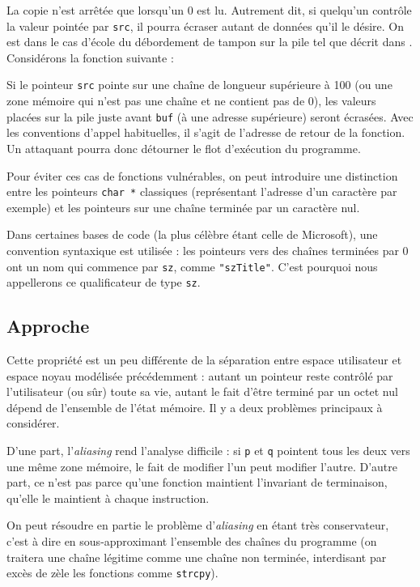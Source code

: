 
La copie n'est arrêtée que lorsqu'un 0 est lu. Autrement dit, si quelqu'un
contrôle la valeur pointée par \texttt{src}, il pourra écraser autant de données
qu'il le désire. On est dans le cas d'école du débordement de tampon sur la pile
tel que décrit dans \cite{SmashingTheStack}. Considérons la fonction suivante :


Si le pointeur \texttt{src} pointe sur une chaîne de longueur supérieure à 100
(ou une zone mémoire qui n'est pas une chaîne et ne contient pas de 0), les
valeurs placées sur la pile juste avant \texttt{buf} (à une adresse supérieure)
seront écrasées. Avec les conventions d'appel habituelles, il s'agit de
l'adresse de retour de la fonction. Un attaquant pourra donc détourner le flot
d'exécution du programme.

Pour éviter ces cas de fonctions vulnérables, on peut introduire une distinction
entre les pointeurs \texttt{char *} classiques (représentant l'adresse d'un
caractère par exemple) et les pointeurs sur une chaîne terminée par un caractère
nul.

Dans certaines bases de code (la plus célèbre étant celle de Microsoft), une
convention syntaxique est utilisée : les pointeurs vers des chaînes terminées
par 0 ont un nom qui commence par \texttt{sz}, comme \texttt{"szTitle"}. C'est
pourquoi nous appellerons ce qualificateur de type \texttt{sz}.

\subsection{Approche}

Cette propriété est un peu différente de la séparation entre espace utilisateur
et espace noyau modélisée précédemment : autant un pointeur reste contrôlé par
l'utilisateur (ou sûr) toute sa vie, autant le fait d'être terminé par un octet
nul dépend de l'ensemble de l'état mémoire. Il y a deux problèmes principaux à
considérer.

D'une part, l'\emph{aliasing} rend l'analyse difficile : si \texttt{p} et
\texttt{q} pointent tous les deux vers une même zone mémoire, le fait de
modifier l'un peut modifier l'autre. D'autre part, ce n'est pas parce qu'une
fonction maintient l'invariant de terminaison, qu'elle le maintient à chaque
instruction.

On peut résoudre en partie le problème d'\emph{aliasing} en étant très
conservateur, c'est à dire en sous-approximant l'ensemble des chaînes du
programme (on traitera une chaîne légitime comme une chaîne non terminée,
interdisant par excès de zèle les fonctions comme \texttt{strcpy}).


